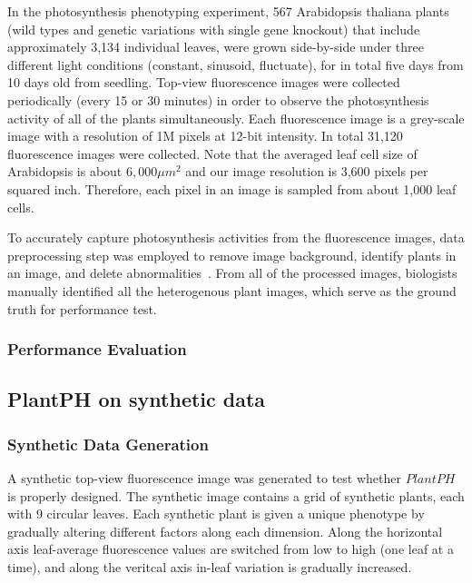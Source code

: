 \documentclass{bioinfo}
\begin{document}
In the photosynthesis phenotyping experiment, 567 Arabidopsis thaliana plants (wild types and genetic variations with single gene knockout) that include approximately 3,134 individual leaves, were grown side-by-side under three different light conditions (constant, sinusoid, fluctuate), for in total five days from 10 days old from seedling.
%
Top-view fluorescence images were collected periodically (every 15 or 30 minutes) in order to observe the photosynthesis activity of all of the plants simultaneously. Each fluorescence image is a grey-scale image with a resolution of 1M pixels at 12-bit intensity. In total 31,120 fluorescence images were collected. Note that the averaged leaf cell size of Arabidopsis is about $6,000 \mu m^2$ \citep{gegas2014endopolyploidy} and our image resolution is 3,600 pixels per squared inch. Therefore, each pixel in an image is sampled from about 1,000 leaf cells.

To accurately capture photosynthesis activities from the fluorescence images, data preprocessing step was employed to remove image background, identify plants in an image, and delete abnormalities~\citep{xu2015plant}. From all of the processed images,  biologists manually identified all the heterogenous plant images, which serve as the ground truth for performance test.


%

%



\subsubsection{Performance Evaluation}





\subsection{PlantPH on synthetic data}

\subsubsection{Synthetic Data Generation}
A synthetic top-view fluorescence image was generated to test whether $PlantPH$ is properly designed. The synthetic image contains a grid of synthetic plants, each with 9 circular leaves. Each synthetic plant is given a unique phenotype by gradually altering different factors along each dimension. Along the horizontal axis leaf-average fluorescence values are  switched from low to high (one leaf at a time), and along the veritcal axis in-leaf variation is gradually increased. 
\end{document}

